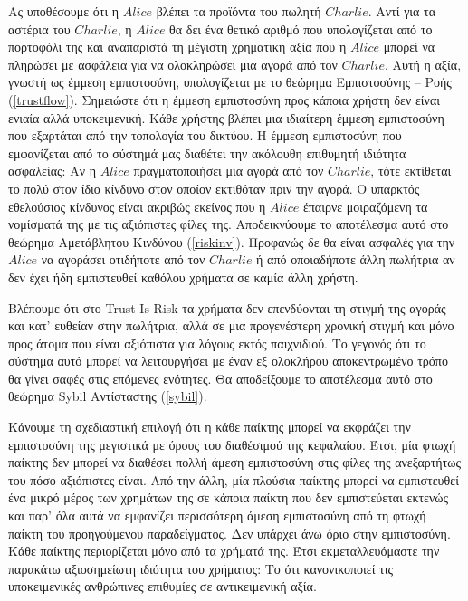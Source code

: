   Ας υποθέσουμε ότι η $Alice$ βλέπει τα προϊόντα του πωλητή $Charlie$. Αντί για τα αστέρια του $Charlie$, η $Alice$ θα δει ένα
  θετικό αριθμό που υπολογίζεται από το πορτοφόλι της και αναπαριστά τη μέγιστη χρηματική αξία που η $Alice$ μπορεί να
  πληρώσει με ασφάλεια για να ολοκληρώσει μια αγορά από τον $Charlie$. Αυτή η αξία, γνωστή ως έμμεση εμπιστοσύνη, υπολογίζεται
  με το θεώρημα Εμπιστοσύνης -- Ροής (\ref{trustflow}). Σημειώστε ότι η έμμεση εμπιστοσύνη προς κάποια χρήστη δεν είναι ενιαία
  αλλά υποκειμενική. Κάθε χρήστης βλέπει μια ιδιαίτερη έμμεση εμπιστοσύνη που εξαρτάται από την τοπολογία του δικτύου. Η
  έμμεση εμπιστοσύνη που εμφανίζεται από το σύστημά μας διαθέτει την ακόλουθη επιθυμητή ιδιότητα ασφαλείας: Αν η $Alice$
  πραγματοποιήσει μια αγορά από τον $Charlie$, τότε εκτίθεται το πολύ στον ίδιο κίνδυνο στον οποίον εκτιθόταν πριν την αγορά.
  Ο υπαρκτός εθελούσιος κίνδυνος είναι ακριβώς εκείνος που η $Alice$ έπαιρνε μοιραζόμενη τα νομίσματά της με τις αξιόπιστες
  φίλες της. Αποδεικνύουμε το αποτέλεσμα αυτό στο θεώρημα Αμετάβλητου Κινδύνου (\ref{riskinv}). Προφανώς δε θα είναι ασφαλές
  για την $Alice$ να αγοράσει οτιδήποτε από τον $Charlie$ ή από οποιαδήποτε άλλη πωλήτρια αν δεν έχει ήδη εμπιστευθεί καθόλου
  χρήματα σε καμία άλλη χρήστη.

  Βλέπουμε ότι στο \textlatin{Trust Is Risk} τα χρήματα δεν επενδύονται τη στιγμή της αγοράς και κατ' ευθείαν στην πωλήτρια,
  αλλά σε μια προγενέστερη χρονική στιγμή και μόνο προς άτομα που είναι αξιόπιστα για λόγους εκτός παιχνιδιού. Το γεγονός ότι
  το σύστημα αυτό μπορεί να λειτουργήσει με έναν εξ ολοκλήρου αποκεντρωμένο τρόπο θα γίνει σαφές στις επόμενες ενότητες. Θα
  αποδείξουμε το αποτέλεσμα αυτό στο θεώρημα \textlatin{Sybil} Αντίσταστης (\ref{sybil}).

  Κάνουμε τη σχεδιαστική επιλογή ότι η κάθε παίκτης μπορεί να εκφράζει την εμπιστοσύνη της μεγιστικά με όρους του διαθέσιμού
  της κεφαλαίου. Έτσι, μία φτωχή παίκτης δεν μπορεί να διαθέσει πολλή άμεση εμπιστοσύνη στις φίλες της ανεξαρτήτως του πόσο
  αξιόπιστες είναι. Από την άλλη, μία πλούσια παίκτης μπορεί να εμπιστευθεί ένα μικρό μέρος των χρημάτων της σε κάποια
  παίκτη που δεν εμπιστεύεται εκτενώς και παρ' όλα αυτά να εμφανίζει περισσότερη άμεση εμπιστοσύνη από τη φτωχή παίκτη του
  προηγούμενου παραδείγματος. Δεν υπάρχει άνω όριο στην εμπιστοσύνη. Κάθε παίκτης περιορίζεται μόνο από τα χρήματά της. Έτσι
  εκμεταλλευόμαστε την παρακάτω αξιοσημείωτη ιδιότητα του χρήματος: Το ότι κανονικοποιεί τις υποκειμενικές ανθρώπινες
  επιθυμίες σε αντικειμενική αξία.

